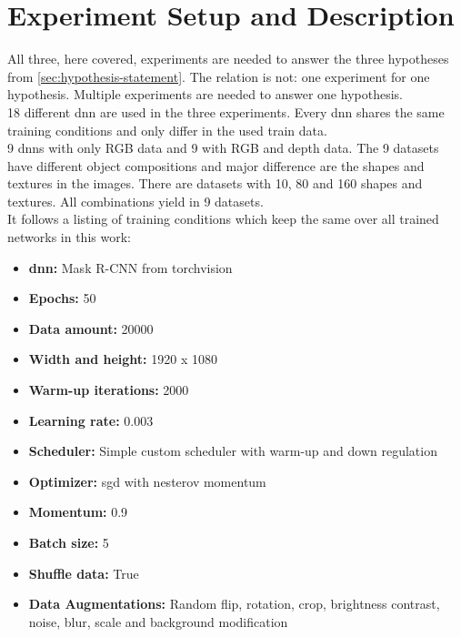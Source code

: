 \chapter{Experiment Setup and Description}
\label{chap:kapitel4}

	All three, here covered, experiments are needed to answer the three hypotheses from \ref{sec:hypothesis-statement}. The relation is not: one experiment for one hypothesis. Multiple experiments are needed to answer one hypothesis.\\
	18 different \acl{dnn} are used in the three experiments. Every \ac{dnn} shares the same training conditions and only differ in the used train data.\\
	9 \ac{dnn}s with only RGB data and 9 with RGB and depth data. The 9 datasets have different object compositions and major difference are the shapes and textures in the images. There are datasets with 10, 80 and 160 shapes and textures. All combinations yield in 9 datasets.\\
	It follows a listing of training conditions which keep the same over all trained networks in this work:
	\begin{itemize}
		\item \textbf{\ac{dnn}:} Mask R-CNN from torchvision
		\item \textbf{Epochs:} 50
		\item \textbf{Data amount:} 20000
		\item \textbf{Width and height:} 1920 x 1080
		\item \textbf{Warm-up iterations:} 2000
		\item \textbf{Learning rate:} 0.003
		\item \textbf{Scheduler:} Simple custom scheduler with warm-up and down regulation
		\item \textbf{Optimizer:} \acl{sgd} with nesterov momentum \cite{Botev2016}
		\item \textbf{Momentum:} 0.9
		\item \textbf{Batch size:} 5
		\item \textbf{Shuffle data:} True
		\item \textbf{Data Augmentations:} Random flip, rotation, crop, brightness contrast, noise, blur, scale and background modification
	\end{itemize}
	
	
	
